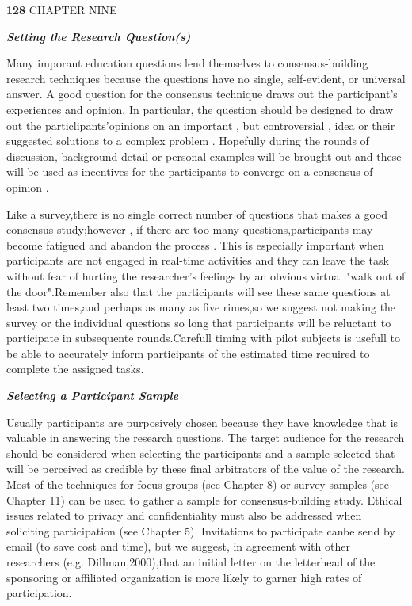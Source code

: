\documentclass[10pt,a4paper]{book}
\begin{document}
\begin{flushleft}
  \textbf{128} \qquad  \tiny CHAPTER NINE
\end{flushleft}

\begin{flushleft}
  \textsl{\textbf{Setting the Research Question(s)}}
\end{flushleft}

Many imporant education questions lend themselves to consensus-building research techniques because the questions have no single, self-evident, or universal answer. A good question for the consensus technique draws out the participant's experiences and opinion. In particular, the question should be designed to draw out the particlipants'opinions on an important , but controversial , idea or their suggested solutions to a complex problem . Hopefully during the rounds of discussion, background detail or personal examples will be brought out and these will be used as incentives for the participants to converge on a consensus of opinion .

Like a survey,there is no single correct number of questions that makes a good consensus study;however , if there are too many questions,participants may become fatigued and abandon the process . This is especially important when participants are not engaged in real-time activities and they can leave the task without fear of hurting the researcher's feelings by an obvious virtual "walk out of the door".Remember also that the participants will see these same questions at least two times,and perhaps as many as five rimes,so we suggest not making the survey or the individual questions so long that participants will be reluctant to participate in subsequente rounds.Carefull timing with pilot subjects is usefull to be able to accurately inform participants of the estimated time required to complete the assigned tasks.

\begin{flushleft}
\textsl{\textbf{Selecting a Participant Sample}}
\end{flushleft}

Usually participants are purposively chosen because they have knowledge that is valuable in answering the research questions. The target audience for the research should be considered when selecting the participants and a sample selected that will be perceived as credible by these final arbitrators of the value of the research. Most of the techniques for focus groups (see Chapter 8) or survey samples (see Chapter 11) can be used to gather a sample for consensus-building study. Ethical issues related to privacy and confidentiality must also be addressed when soliciting participation (see Chapter 5). Invitations to participate canbe send by email (to save cost and time), but we suggest, in agreement with other researchers (e.g. Dillman,2000),that an initial letter on the letterhead of the sponsoring or affiliated organization is more likely to garner high rates of participation.
\end{document}
